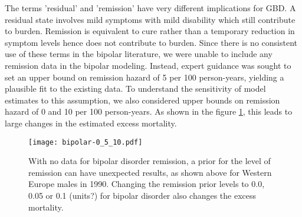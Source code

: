 The terms 'residual' and 'remission' have very different implications for GBD.  A residual state involves mild symptoms with mild disability which still contribute to burden. Remission is equivalent to cure rather than a temporary reduction in symptom levels hence does not contribute to burden. Since there is no consistent use of these terms in the bipolar literature, we were unable to include any remission data in the bipolar modeling. Instead, expert guidance was sought to set an upper bound on remission hazard of 5 per 100 person-years, yielding a plausible fit to the existing data. To understand the sensitivity of model estimates to this assumption, we also considered upper bounds on remission hazard of 0 and 10 per 100 person-years.  As shown in the figure \ref{fig:app-bipolar remission}, this leads to large changes in the estimated excess mortality.

    \begin{figure}[h]
        \begin{center}
            \texttt{[image: bipolar-0\_5\_10.pdf]}
            \caption{With no data for bipolar disorder remission, a prior for the level of remission can have unexpected results, as shown above for Western Europe males in 1990.  Changing the remission prior levels to 0.0, 0.05 or 0.1 (units?) for bipolar disorder also changes the excess mortality.}
            \label{fig:app-bipolar remission}
        \end{center}
    \end{figure}

